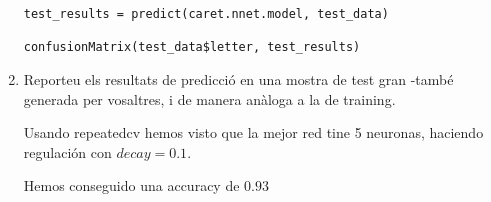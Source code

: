 \documentclass[a4paper]{article}
\begin{document}
\begin{enumerate}
\begin{lstlisting}
test_results = predict(caret.nnet.model, test_data)

confusionMatrix(test_data$letter, test_results)
        \end{lstlisting}
        \item Reporteu els resultats de predicció en una mostra de test gran -també generada per vosaltres, i de
        manera anàloga a la de training.

        Usando repeatedcv hemos visto que la mejor red tine 5 neuronas, haciendo regulación con $decay = 0.1$.

        Hemos conseguido una accuracy de $0.93$

    \end{enumerate}
\end{document}
